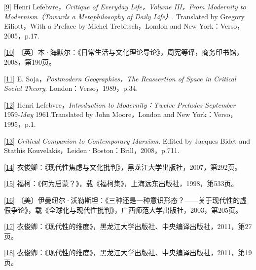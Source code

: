\documentclass[UTF8, fontset = sourcesans, a4paper, oneside, zihao =
-4, scheme=chinese, no-math, space=true]{ctexbook}
\begin{document}
\protect\hypertarget{part0005_split_003.htmlux5cux23m9}{}{}\protect\hyperlink{part0005_split_001.htmlux5cux23w9}{{[}9{]}}
Henri Lefebvre，\emph{Critique of Everyday Life，Volume III，From
Modernity to Modernism（Towards a Metaphilosophy of Daily Life）}.
Translated by Gregory Eiliott，With a Preface by Michel
Trebitsch，London and New York：Verso，2005，p.17.

\protect\hypertarget{part0005_split_003.htmlux5cux23m10}{}{}\protect\hyperlink{part0005_split_001.htmlux5cux23w10}{{[}10{]}}
〔英〕本·海默尔：《日常生活与文化理论导论》，周宪等译，商务印书馆，2008，第190页。

\protect\hypertarget{part0005_split_003.htmlux5cux23m11}{}{}\protect\hyperlink{part0005_split_001.htmlux5cux23w11}{{[}11{]}}
E. Soja，\emph{Postmodern Geographies，The Reassertion of Space in
Critical Social Theory}. London：Verso，1989，p.34.

\protect\hypertarget{part0005_split_003.htmlux5cux23m12}{}{}\protect\hyperlink{part0005_split_002.htmlux5cux23w12}{{[}12{]}}
Henri Lefebvre，\emph{Introduction to Modernity：Twelve Preludes
September} 1959-\emph{May} 1961.Translated by John Moore，London and New
York：Verso，1995，p.1.

\protect\hypertarget{part0005_split_003.htmlux5cux23m13}{}{}\protect\hyperlink{part0005_split_002.htmlux5cux23w13}{{[}13{]}}
\emph{Critical Companion to Contemporary Marxism}. Edited by Jacques
Bidet and Stathis Kouvelakis，Leiden·Boston：Brill，2008，p.711.

\protect\hypertarget{part0005_split_003.htmlux5cux23m14}{}{}\protect\hyperlink{part0005_split_002.htmlux5cux23w14}{{[}14{]}}
衣俊卿：《现代性焦虑与文化批判》，黑龙江大学出版社，2007，第292页。

\protect\hypertarget{part0005_split_003.htmlux5cux23m15}{}{}\protect\hyperlink{part0005_split_002.htmlux5cux23w15}{{[}15{]}}
福柯：《何为启蒙？》，载《福柯集》，上海远东出版社，1998，第533页。

\protect\hypertarget{part0005_split_003.htmlux5cux23m16}{}{}\protect\hyperlink{part0005_split_002.htmlux5cux23w16}{{[}16{]}}
〔美〕伊曼纽尔·沃勒斯坦：《三种还是一种意识形态？------关于现代性的虚假争论》，载《全球化与现代性批判》，广西师范大学出版社，2003，第205页。

\protect\hypertarget{part0005_split_003.htmlux5cux23m17}{}{}\protect\hyperlink{part0005_split_002.htmlux5cux23w17}{{[}17{]}}
衣俊卿：《现代性的维度》，黑龙江大学出版社、中央编译出版社，2011，第27页。

\protect\hypertarget{part0005_split_003.htmlux5cux23m18}{}{}\protect\hyperlink{part0005_split_002.htmlux5cux23w18}{{[}18{]}}
衣俊卿：《现代性的维度》，黑龙江大学出版社、中央编译出版社，2011，第19页。
\end{document}
